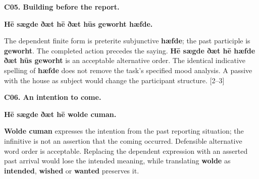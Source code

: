 \par\begin{minipage}{\linewidth}\raggedright
\textbf{C05. Building before the report.}

\textbf{Hē sægde ðæt hē ðæt hūs geworht hæfde.}

The dependent finite form is preterite subjunctive \textbf{hæfde}; the past participle is \textbf{geworht}. The completed action precedes the saying. \textbf{Hē sægde ðæt hē hæfde ðæt hūs geworht} is an acceptable alternative order. The identical indicative spelling of \textbf{hæfde} does not remove the task's specified mood analysis. A passive with the house as subject would change the participant structure. [2–3]

\end{minipage}\par\addvspace{4pt}

\par\begin{minipage}{\linewidth}\raggedright
\textbf{C06. An intention to come.}

\textbf{Hē sægde ðæt hē wolde cuman.}

\textbf{Wolde cuman} expresses the intention from the past reporting situation; the infinitive is not an assertion that the coming occurred. Defensible alternative word order is acceptable. Replacing the dependent expression with an asserted past arrival would lose the intended meaning, while translating \textbf{wolde} as \textbf{intended}, \textbf{wished} or \textbf{wanted} preserves it.

\end{minipage}\par\addvspace{4pt}

